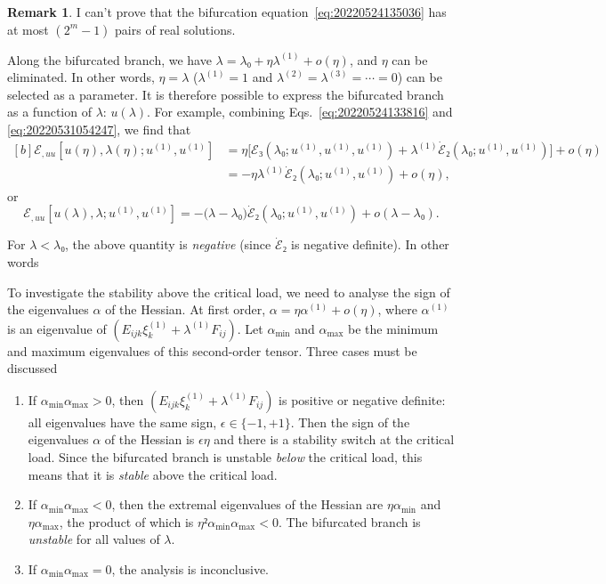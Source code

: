 \documentclass[12pt, final]{scrartcl}
\theoremstyle{definition}
\newtheorem{remark}{Remark}
\newcommand{\order}[2][1]{#2^{(#1)}}
\begin{document}
\begin{remark}
  I can't prove that the bifurcation equation~\eqref{eq:20220524135036} has at
  most \((2^m - 1)\) pairs of real solutions.
\end{remark}

Along the bifurcated branch, we have \(λ = λ₀ + η \order[1]λ + o(η)\), and \(η\) can be
eliminated. In other words, \(η=λ\) (\(\order[1]λ=1\) and \(\order[2]λ = \order[3]λ = \cdots = 0\)) can
be selected as a parameter. It is therefore possible to express the bifurcated
branch as a function of \(λ\): \(u(λ)\). For example, combining
Eqs.~\eqref{eq:20220524133816} and \eqref{eq:20220531054247}, we find that
\begin{equation}
  \begin{aligned}[b]
    ℰ_{, uu}[u(η), λ(η); \order[1]u, \order[1]u]
    &= η \bigl[ℰ₃(λ₀ ; \order[1]u, \order[1]u, \order[1]u)  + \order[1]λ \dot{ℰ}₂(λ₀; \order[1]u, \order[1]u)\bigr] + o(η)\\
    &= - η \order[1]λ \dot{ℰ}₂(λ₀; \order[1]u, \order[1]u) + o(η),
  \end{aligned}
\end{equation}
or
\begin{equation}
  \label{eq:20220819160235}
  ℰ_{, uu}[u(λ), λ; \order[1]u, \order[1]u] = -\bigl( λ - λ₀ \bigr) \dot{ℰ}₂(λ₀; \order[1]u, \order[1]u) + o(λ - λ₀).
\end{equation}

For \(λ < λ₀\), the above quantity is \emph{negative} (since \(\dot{ℰ}₂\) is
negative definite). In other words

\begin{center}
\end{center}

To investigate the stability above the critical load, we need to analyse the
sign of the eigenvalues \(α\) of the Hessian. At first order,
\(α = η \order[1]α + o(η)\), where \(\order[1]α\) is an eigenvalue of
\((E_{ijk} \order[1]{ξ_k} + \order[1]λ F_{ij})\). Let \(α_{\min}\) and \(α_{\max}\) be the minimum
and maximum eigenvalues of this second-order tensor. Three cases must be
discussed
\begin{enumerate}
\item If \(α_{\min} α_{\max} > 0\), then \((E_{ijk} \order[1]{ξ_k} + \order[1]λ F_{ij})\) is
  positive or negative definite: all eigenvalues have the same sign,
  \(\epsilon ∈ \{-1, +1\}\). Then the sign of the eigenvalues \(α\) of the
  Hessian is \(\epsilon η\) and there is a stability switch at the critical
  load. Since the bifurcated branch is unstable \emph{below} the critical load,
  this means that it is \emph{stable} above the critical load.
\item If \(α_{\min} α_{\max} < 0\), then the extremal eigenvalues of the Hessian
  are \(η α_{\min}\) and \(η α_{\max}\), the product of which is
  \(η² α_{\min} α_{\max} < 0\). The bifurcated branch is \emph{unstable} for all
  values of \(λ\).
\item If \(α_{\min} α_{\max} = 0\), the analysis is inconclusive.
\end{enumerate}
\end{document}
